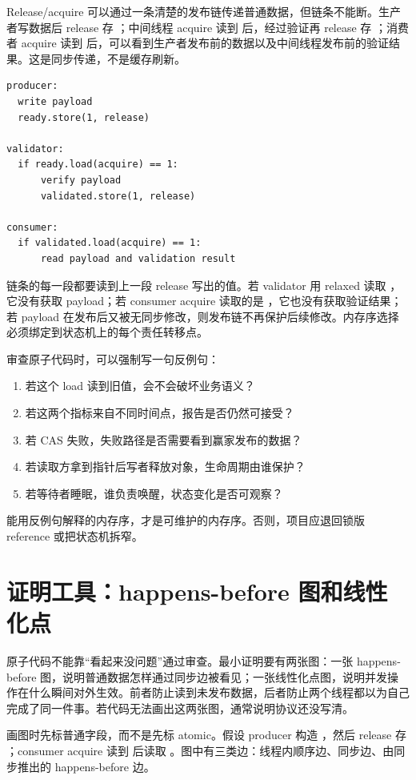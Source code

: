 Release/acquire 可以通过一条清楚的发布链传递普通数据，但链条不能断。生产者写数据后 release 存 ；中间线程 acquire 读到  后，经过验证再 release 存 ；消费者 acquire 读到  后，可以看到生产者发布前的数据以及中间线程发布前的验证结果。这是同步传递，不是缓存刷新。

\begin{lstlisting}[numbers=none,caption={发布链的语义账本}]
producer:
  write payload
  ready.store(1, release)

validator:
  if ready.load(acquire) == 1:
      verify payload
      validated.store(1, release)

consumer:
  if validated.load(acquire) == 1:
      read payload and validation result
\end{lstlisting}

链条的每一段都要读到上一段 release 写出的值。若 validator 用 relaxed 读取 ，它没有获取 payload；若 consumer acquire 读取的是 ，它也没有获取验证结果；若 payload 在发布后又被无同步修改，则发布链不再保护后续修改。内存序选择必须绑定到状态机上的每个责任转移点。

审查原子代码时，可以强制写一句反例句：
\begin{enumerate}
  \item 若这个 load 读到旧值，会不会破坏业务语义？
  \item 若这两个指标来自不同时间点，报告是否仍然可接受？
  \item 若 CAS 失败，失败路径是否需要看到赢家发布的数据？
  \item 若读取方拿到指针后写者释放对象，生命周期由谁保护？
  \item 若等待者睡眠，谁负责唤醒，状态变化是否可观察？
\end{enumerate}
能用反例句解释的内存序，才是可维护的内存序。否则，项目应退回锁版 reference 或把状态机拆窄。

\section{证明工具：happens-before 图和线性化点}

原子代码不能靠“看起来没问题”通过审查。最小证明要有两张图：一张 happens-before 图，说明普通数据怎样通过同步边被看见；一张线性化点图，说明并发操作在什么瞬间对外生效。前者防止读到未发布数据，后者防止两个线程都以为自己完成了同一件事。若代码无法画出这两张图，通常说明协议还没写清。

画图时先标普通字段，而不是先标 atomic。假设 producer 构造 ，然后 release 存 ；consumer acquire 读到  后读取 。图中有三类边：线程内顺序边、同步边、由同步推出的 happens-before 边。

